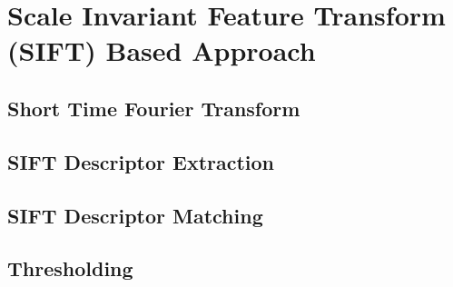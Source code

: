 \section{Scale Invariant Feature Transform (SIFT) Based Approach}

\subsection{Short Time Fourier Transform}

\subsection{SIFT Descriptor Extraction}

\subsection{SIFT Descriptor Matching}

\subsection{Thresholding}